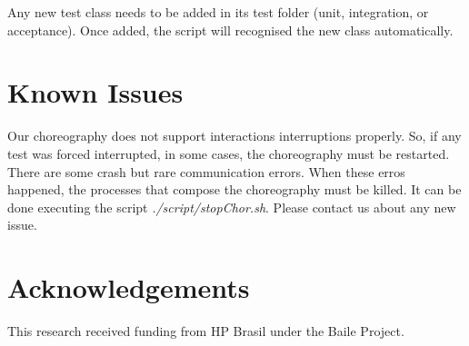 \documentclass{article}	%
\begin{document}
Any new test class needs to be added in its test folder (unit, integration, or acceptance). Once added, the script will recognised the new class automatically. 

\section{ Known Issues }
Our choreography does not support interactions interruptions properly. So, if any test was forced interrupted, in some cases, the choreography must be restarted. There are some crash but rare communication errors. When these erros happened, the processes that compose the choreography must be killed. It can be done executing the script \textit{./script/stopChor.sh}. Please contact us about any new issue.

\section{Acknowledgements}
This research received funding from HP Brasil under the Baile Project.


\newpage

\end{document}
